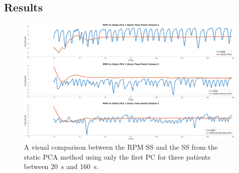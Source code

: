         \subsection{Results} \label{sec:pca_data_driven_surrogate_signal_extraction_methods_for_dynamic_pet_results}
            \begin{figure}
                \centering
                
                \includegraphics[width=1.0\linewidth]{figures/data_driven_surrogate_signal_extraction_results_1_vanilla_surrogate_signal.png}
                
                \captionsetup{singlelinecheck=false, justification=centering}
                \caption{A visual comparison between the \gls{RPM} \gls{SS} and the \gls{SS} from the static \gls{PCA} method using only the first \gls{PC} for three patients between \SI{20}{\second} and \SI{160}{\second}.}
                \label{fig:pca_data_driven_surrogate_signal_extraction_methods_for_dynamic_pet_results_vanilla_surrogate_signal}
            \end{figure}
            
